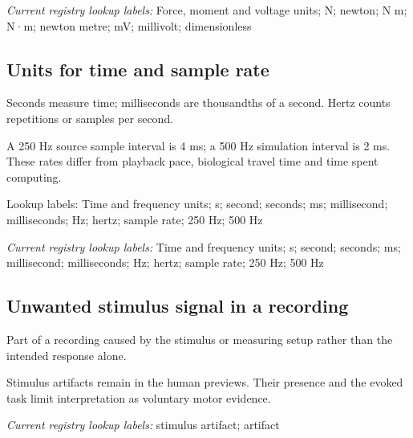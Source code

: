\noindent\textit{Current registry lookup labels:} Force, moment and voltage units; N; newton; N m; N·m; newton metre; mV; millivolt; dimensionless\par

\begin{samepage}
\subsection*{Units for time and sample rate}
\noindent Seconds measure time; milliseconds are thousandths of a second. Hertz counts repetitions or samples per second.\par
\end{samepage}
\begin{samepage}
\noindent A 250 Hz source sample interval is 4 ms; a 500 Hz simulation interval is 2 ms. These rates differ from playback pace, biological travel time and time spent computing.\par\nopagebreak[4]
\noindent\textnormal{Lookup labels:} Time and frequency units; s; second; seconds; ms; millisecond; milliseconds; Hz; hertz; sample rate; 250 Hz; 500 Hz\par
\end{samepage}


\noindent\textit{Current registry lookup labels:} Time and frequency units; s; second; seconds; ms; millisecond; milliseconds; Hz; hertz; sample rate; 250 Hz; 500 Hz\par

\begin{samepage}
\subsection*{Unwanted stimulus signal in a recording}
\noindent Part of a recording caused by the stimulus or measuring setup rather than the intended response alone.\par
\end{samepage}
\begin{samepage}
\noindent Stimulus artifacts remain in the human previews. Their presence and the evoked task limit interpretation as voluntary motor evidence.\par\nopagebreak[4]

\end{samepage}


\noindent\textit{Current registry lookup labels:} stimulus artifact; artifact\par

